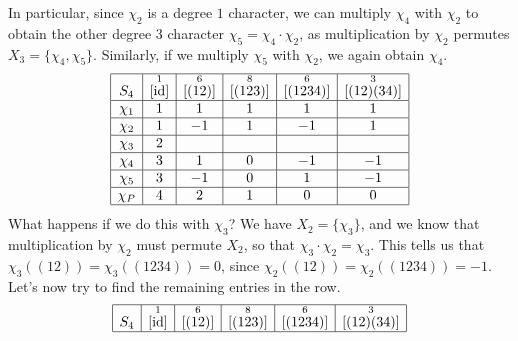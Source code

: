 \begin{exmp}{}
    In particular, since $\chi_2$ is a degree $1$ character, we can multiply 
    $\chi_4$ with $\chi_2$ to obtain the other degree $3$ character 
    $\chi_5 = \chi_4 \cdot \chi_2$, as multiplication by $\chi_2$ permutes 
    $X_3 = \{\chi_4, \chi_5\}$. Similarly, if we multiply $\chi_5$ with 
    $\chi_2$, we again obtain $\chi_4$. 
    \begin{align*}
        \begin{array}{|c|c|c|c|c|c|}
            \hline
            S_4    & \overset{1}{[\operatorname{id}]} & \overset{6}{[(12)]} & \overset{8}{[(123)]} & \overset{6}{[(1234)]} & \overset{3}{[(12)(34)]} \\ \hline
            \chi_1 & 1                  & 1                   & 1                    & 1                     & 1                       \\ \hline
            \chi_2 & 1                  & -1                  & 1                    & -1                    & 1                       \\ \hline
            \chi_3 & 2                  &                     &                      &                       &                         \\ \hline
            \chi_4 & 3                  & 1                   & 0                    & -1                    & -1                      \\ \hline
            \chi_5 & 3                  & -1                  & 0                    & 1                     & -1                      \\ \hline
            \chi_P & 4                  & 2                   & 1                    & 0                     & 0                       \\ \hline 
        \end{array} 
    \end{align*}
    What happens if we do this with $\chi_3$? We have $X_2 = \{\chi_3\}$, 
    and we know that multiplication by $\chi_2$ must permute $X_2$, so that 
    $\chi_3 \cdot \chi_2 = \chi_3$. This tells us that 
    $\chi_3((12)) = \chi_3((1234)) = 0$, since $\chi_2((12)) = \chi_2((1234)) 
    = -1$. Let's now try to find the remaining entries in the row. 
    \begin{align*}
        \begin{array}{|c|c|c|c|c|c|}
            \hline
            S_4    & \overset{1}{[\operatorname{id}]} & \overset{6}{[(12)]} & \overset{8}{[(123)]} & \overset{6}{[(1234)]} & \overset{3}{[(12)(34)]} \\ \hline

\end{array}
\end{align*}
\end{exmp}
